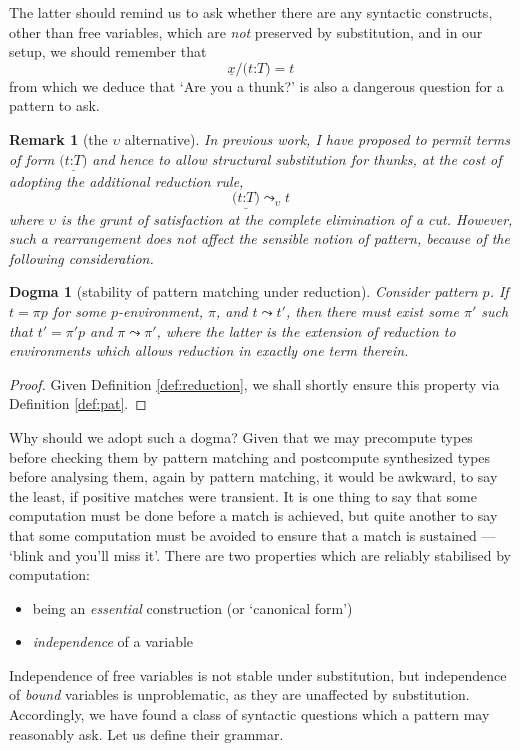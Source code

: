 \documentclass{jfp1}
\newtheorem{remark}[theorem]{Remark}
\newtheorem{dogma}[theorem]{Dogma}
\newcommand{\fsl}{\texttt{/}}
\newcommand{\Pa}[1]{\texttt{(}#1\texttt{)}}
\newcommand{\hb}{\texttt{:}}
\newcommand{\ra}[2]{\Pa{#1 \hb #2}}
\newcommand{\Ne}{\underline}
\begin{document}
The latter should remind us to ask whether there are any syntactic
constructs, other than free variables, which are \emph{not} preserved
by substitution, and in our setup, we should remember that
\[
  \Ne x\fsl\ra tT = t
\]
from which we deduce that `Are you a thunk?' is also a dangerous
question for a pattern to ask.

\begin{remark}[the $\upsilon$ alternative]
  In previous work, I have proposed to permit terms of form $\Ne{\ra
    tT}$ and hence to allow structural substitution for thunks, at the
  cost of adopting the additional reduction rule,
  \[
    \Ne{\ra tT} \leadsto_\upsilon t
  \]
  where $\upsilon$ is the grunt of satisfaction at the complete
  elimination of a cut. However, such a rearrangement does not
  affect the sensible notion of pattern, because of the following
  consideration.
\end{remark}

\begin{dogma}[stability of pattern matching under reduction]
  Consider pattern $p$. If $t=\pi p$ for some $p$-environment, $\pi$,
  and $t\leadsto t'$, then there must exist some $\pi'$ such that
  $t'=\pi' p$ and $\pi\leadsto\pi'$, where the latter is the
  extension of reduction to environments which allows reduction in exactly
  one term therein.
\end{dogma}
\begin{proof}
  Given Definition \ref{def:reduction}, we shall shortly ensure this property
  via Definition \ref{def:pat}.
\end{proof}

Why should we adopt such a dogma? Given that we may precompute types
before checking them by pattern matching and postcompute synthesized
types before analysing them, again by pattern matching, it would be
awkward, to say the least, if positive matches were transient. It is
one thing to say that some computation must be done before a match is
achieved, but quite another to say that some computation must be
avoided to ensure that a match is sustained --- `blink and you'll
miss it'. There are two properties which are reliably stabilised
by computation:
\begin{itemize}
\item being an \emph{essential} construction (or `canonical form')
\item \emph{independence} of a variable
\end{itemize}

Independence of free variables is not stable under substitution,
but independence of \emph{bound} variables is unproblematic, as they
are unaffected by substitution. Accordingly, we have found a class
of syntactic questions which a pattern may reasonably ask. Let us
define their grammar.
\end{document}
